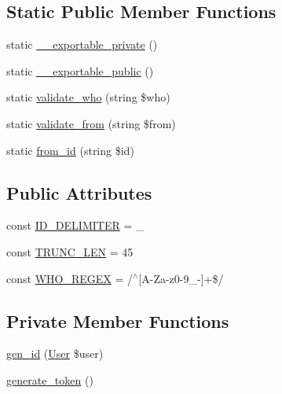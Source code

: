 \subsection*{Static Public Member Functions}
\begin{DoxyCompactItemize}
\item 
static \hyperlink{classlibresignage_1_1common_1_1php_1_1auth_1_1Session_ac1c5c099a51e73f568b96610d5eac1b5}{\+\_\+\+\_\+exportable\+\_\+private} ()
\item 
static \hyperlink{classlibresignage_1_1common_1_1php_1_1auth_1_1Session_a7fd362c6e8eee99fe4dc52578c5f052d}{\+\_\+\+\_\+exportable\+\_\+public} ()
\item 
static \hyperlink{classlibresignage_1_1common_1_1php_1_1auth_1_1Session_ad7ad1a89f565dda93e490fab1af105b9}{validate\+\_\+who} (string \$who)
\item 
static \hyperlink{classlibresignage_1_1common_1_1php_1_1auth_1_1Session_ac97b11d3fc056bc0cfdabde4b4d84911}{validate\+\_\+from} (string \$from)
\item 
static \hyperlink{classlibresignage_1_1common_1_1php_1_1auth_1_1Session_ac3fee191faeb6d10ffea413ada7a67aa}{from\+\_\+id} (string \$id)
\end{DoxyCompactItemize}
\subsection*{Public Attributes}
\begin{DoxyCompactItemize}
\item 
const \hyperlink{classlibresignage_1_1common_1_1php_1_1auth_1_1Session_a27c00445846e1f49d949e8079313d170}{I\+D\+\_\+\+D\+E\+L\+I\+M\+I\+T\+ER} = \textquotesingle{}\+\_\+\textquotesingle{}
\item 
const \hyperlink{classlibresignage_1_1common_1_1php_1_1auth_1_1Session_a5d37973e4208de1a4c23a904f5f39c98}{T\+R\+U\+N\+C\+\_\+\+L\+EN} = 45
\item 
const \hyperlink{classlibresignage_1_1common_1_1php_1_1auth_1_1Session_a996175a79e67748933d8a5af388673b5}{W\+H\+O\+\_\+\+R\+E\+G\+EX} = \textquotesingle{}/$^\wedge$\mbox{[}A-\/Za-\/z0-\/9\+\_\+-\/\mbox{]}+\$/\textquotesingle{}
\end{DoxyCompactItemize}
\subsection*{Private Member Functions}
\begin{DoxyCompactItemize}
\item 
\hyperlink{classlibresignage_1_1common_1_1php_1_1auth_1_1Session_ab473ae12cd0ca15342cbc65c00e451b3}{gen\+\_\+id} (\hyperlink{classlibresignage_1_1common_1_1php_1_1auth_1_1User}{User} \$user)
\item 
\hyperlink{classlibresignage_1_1common_1_1php_1_1auth_1_1Session_a296ea2a8da96c5052145dd7ff5be5784}{generate\+\_\+token} ()
\end{DoxyCompactItemize}
